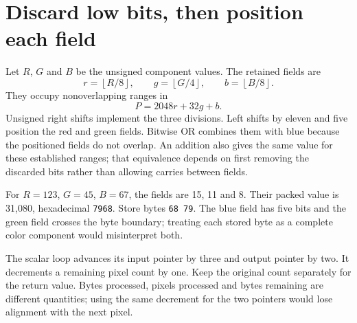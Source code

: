 \section{Discard low bits, then position each field}\label{rgb-packing}
Let $R$, $G$ and $B$ be the unsigned component values. The retained fields are
\[
  r=\left\lfloor R/8\right\rfloor,\qquad
  g=\left\lfloor G/4\right\rfloor,\qquad
  b=\left\lfloor B/8\right\rfloor.
\]
They occupy nonoverlapping ranges in
\[
  P=2048r+32g+b.
\]
Unsigned right shifts implement the three divisions. Left shifts by eleven and
five position the red and green fields. Bitwise OR combines them with blue because
the positioned fields do not overlap. An addition also gives the same value for
these established ranges; that equivalence depends on first removing the discarded
bits rather than allowing carries between fields.

For $R=123$, $G=45$, $B=67$, the fields are 15, 11 and 8. Their packed value is
31,080, hexadecimal \texttt{7968}. Store bytes \texttt{68 79}. The blue field has
five bits and the green field crosses the byte boundary; treating each stored byte
as a complete color component would misinterpret both.

The scalar loop advances its input pointer by three and output pointer by two.
It decrements a remaining pixel count by one. Keep the original count separately
for the return value. Bytes processed, pixels processed and bytes remaining are
different quantities; using the same decrement for the two pointers would lose
alignment with the next pixel.
